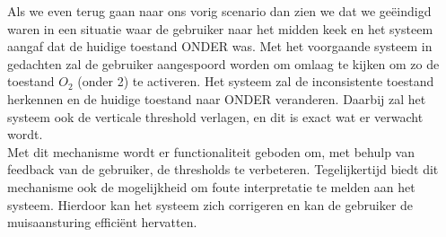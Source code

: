 \documentclass{article}
\begin{document}
Als we even terug gaan naar ons vorig scenario dan zien we dat we geëindigd waren in een situatie waar de gebruiker naar het midden keek en het systeem aangaf dat de huidige toestand ONDER was. Met het voorgaande systeem in gedachten zal de gebruiker aangespoord worden om omlaag te kijken om zo de toestand $O_2$ (onder 2) te activeren. Het systeem zal de inconsistente toestand herkennen en de huidige toestand naar ONDER veranderen. Daarbij zal het systeem ook de verticale threshold verlagen, en dit is exact wat er verwacht wordt.\\

Met dit mechanisme wordt er functionaliteit geboden om, met behulp van feedback van de gebruiker, de thresholds te verbeteren. Tegelijkertijd biedt dit mechanisme ook de mogelijkheid om foute interpretatie te melden aan het systeem. Hierdoor kan het systeem zich corrigeren en kan de gebruiker de muisaansturing effici\"ent hervatten.
\end{document}
